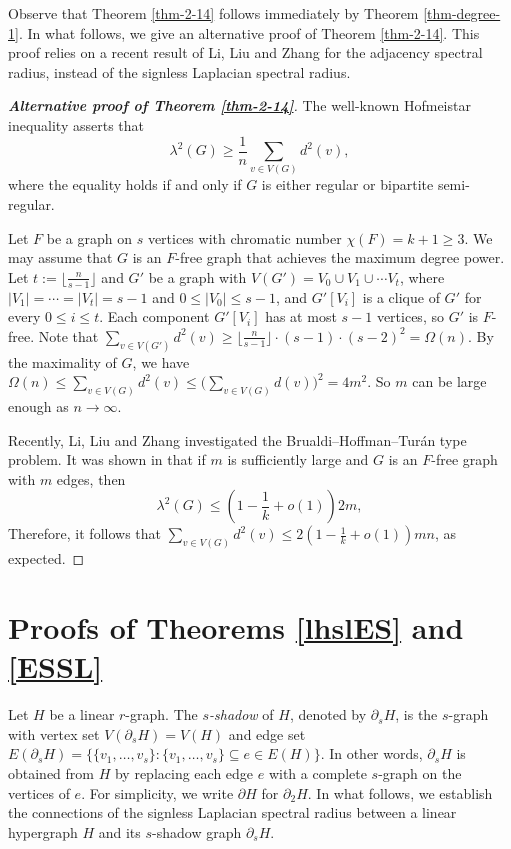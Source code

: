 \documentclass[11pt,a4paper]{article}
\theoremstyle{plain}
\theoremstyle{definition}
\begin{document}
Observe that Theorem \ref{thm-2-14} follows immediately by Theorem \ref{thm-degree-1}.   
In what follows, we give an alternative proof of Theorem \ref{thm-2-14}. 
This proof relies on a recent result of Li, Liu and Zhang \cite{LLZ2025-stability} for the adjacency spectral radius, instead of the signless Laplacian spectral radius.  

\begin{proof}[{\bf Alternative proof of Theorem \ref{thm-2-14}}]
The well-known Hofmeistar inequality asserts that
\begin{equation*}
  \lambda^2 (G) \ge \frac{1}{n} \sum_{v\in V(G)} d^2(v),
  \end{equation*}
where the equality holds if and only if $G$ is either regular or bipartite semi-regular. 

Let $F$ be a graph on $s$ vertices with chromatic number $\chi (F)=k+1\ge 3$. 
We may assume that $G$ is an $F$-free graph that achieves the maximum degree power. 
Let $t:=\lfloor \frac{n}{s-1} \rfloor$ and $G'$ be a graph with $V(G')=V_0\cup V_1\cup \cdots V_t$, where $|V_1|=\cdots = |V_t|=s-1$ and $0\le |V_0|\le s-1$, and $G'[V_i]$ is a clique of $G'$ for every $0\le i\le t$. Each component $G'[V_i]$ has at most $s-1$ vertices, so $G'$ is $F$-free. 
Note that $\sum_{v\in V(G')}d^2(v)\ge \lfloor \frac{n}{s-1}\rfloor \cdot (s-1) \cdot (s-2)^2 = \Omega(n)$. 
By the maximality of $G$, we have
$\Omega (n) \le \sum_{v\in V(G)}d^2(v) \le \bigl( 
\sum_{v\in V(G)} d(v) \bigr)^2= 4m^2$. 
So $m$ can be large enough as $n\to \infty$. 

Recently, Li, Liu and Zhang  \cite{LLZ2025-stability} investigated the Brualdi--Hoffman--Tur\'{a}n type problem. 
It was shown in \cite{LLZ2025-stability} that if $m$ is sufficiently large and 
$G$ is an $F$-free graph with $m$ edges, then
\begin{equation*}
  \lambda^2(G) \le \left( 1-\frac{1}{k} + o(1) \right)2m,
  \end{equation*}
Therefore,
it follows that $\sum_{v\in V(G)} d^2(v) \le 2\left(1-\frac{1}{k} + o(1) \right)mn$, as expected.
\end{proof}




\section{Proofs of Theorems \ref{lhslES} and \ref{ESSL}}

\label{sec-8}

Let $H$ be a linear $r$-graph.  The  {\it $s$-shadow} of $H$, denoted by $\partial_{s}H$, is the $s$-graph with vertex set $V(\partial_{s}H)=V(H)$ and edge set $E(\partial_{s}H)=\{\{v_{1},\ldots,v_{s}\}: \{v_{1},\ldots,v_{s}\}\subseteq e\in E(H)\}$.
 In other words, $\partial_{s}H$ is obtained from $H$ by replacing each edge $e$ with a complete $s$-graph on the vertices of $e$. For simplicity, 
 we write $\partial H$ for $\partial_{2}H$. 
 In what follows, we establish the connections of the signless Laplacian spectral radius between a linear hypergraph $H$ and its $s$-shadow graph $\partial_s H$.
\end{document}
